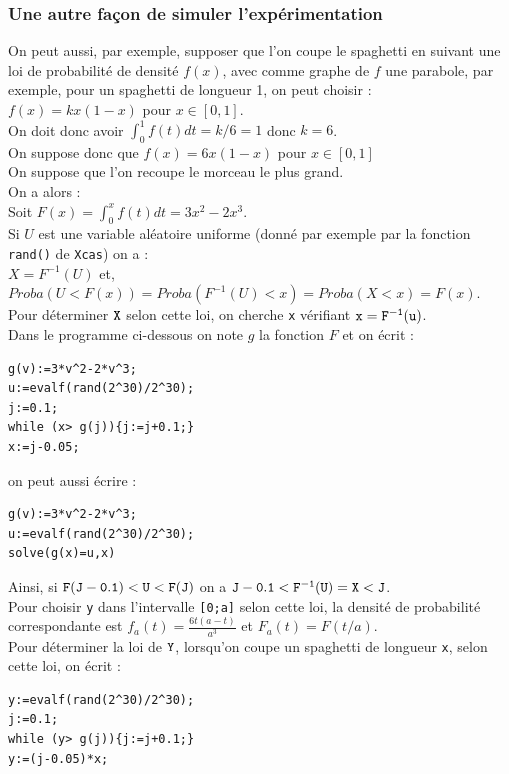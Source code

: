 \documentclass[a4paper,11pt]{book}
\begin{document}
\subsubsection{Une autre fa\c{c}on de simuler l'exp\'erimentation}
On peut aussi, par exemple,  supposer que l'on coupe le spaghetti en suivant 
une loi de probabilit\'e de densit\'e $f(x)$, avec comme graphe de $f$ une 
parabole, par exemple, pour un spaghetti de longueur 1, on peut choisir :\\
$f(x)=kx(1-x)$ pour $x \in [0,1]$.\\
On doit donc avoir $\int_0^1f(t)dt=k/6=1$ donc $k=6$.\\
On suppose donc que $f(x)=6x(1-x)$ pour $x \in [0,1]$\\
On suppose que l'on recoupe le morceau le plus grand.\\
On a alors :\\
Soit $F(x)=\int_0^xf(t)dt=3x^2-2x^3$.\\
Si $U$ est une variable al\'eatoire uniforme (donn\'e par exemple par la 
fonction {\tt rand()} de {\tt Xcas}) on a :\\
$X=F^{-1}(U)$ et,\\
$Proba(U<F(x))=Proba(F^{-1}(U)<x)=Proba(X<x)=F(x)$.\\
Pour d\'eterminer ${\tt X}$ selon cette loi, on cherche {\tt x} v\'erifiant 
${\tt x=F^{-1}(u)}$.\\
 Dans le programme ci-dessous on note $g$ la fonction $F$ et on \'ecrit :
\begin{verbatim}
g(v):=3*v^2-2*v^3;
u:=evalf(rand(2^30)/2^30);
j:=0.1;
while (x> g(j)){j:=j+0.1;}
x:=j-0.05;
\end{verbatim}
on peut aussi \'ecrire :
\begin{verbatim}
g(v):=3*v^2-2*v^3;
u:=evalf(rand(2^30)/2^30);
solve(g(x)=u,x)
\end{verbatim}
Ainsi, si ${\tt F(J-0.1)<U<F(J)}$ on a ${\tt J-0.1<F^{-1}(U)=X<J}$.\\
Pour choisir {\tt y} dans l'intervalle {\tt [0;a]} selon cette loi, la 
densit\'e de probabilit\'e correspondante est $f_a(t)=\frac{6t(a-t)}{a^3}$ et 
$F_a(t)=F(t/a)$.\\
Pour d\'eterminer la loi de ${\tt Y}$, lorsqu'on coupe un spaghetti de
longueur {\tt x}, selon cette loi, on \'ecrit :
\begin{verbatim}
y:=evalf(rand(2^30)/2^30);
j:=0.1;
while (y> g(j)){j:=j+0.1;}
y:=(j-0.05)*x;
\end{verbatim}
\end{document}
